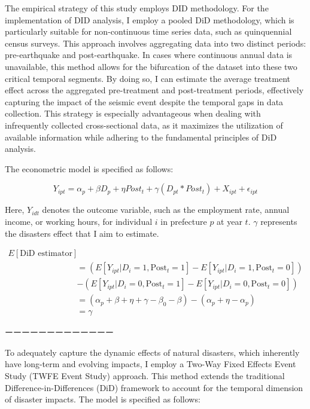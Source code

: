 \documentclass[12pt,halfline,a4paper]{ouparticle}
\begin{document}
The empirical strategy of this study employs DID methodology. For the implementation of DID analysis, I employ a pooled DiD methodology, which is particularly suitable for non-continuous time series data, such as quinquennial census surveys. This approach involves aggregating data into two distinct periods: pre-earthquake and post-earthquake. In cases where continuous annual data is unavailable, this method allows for the bifurcation of the dataset into these two critical temporal segments. By doing so, I can estimate the average treatment effect across the aggregated pre-treatment and post-treatment periods, effectively capturing the impact of the seismic event despite the temporal gaps in data collection. This strategy is especially advantageous when dealing with infrequently collected cross-sectional data, as it maximizes the utilization of available information while adhering to the fundamental principles of DiD analysis.

The econometric model is specified as follows:

\begin{equation}
Y_{ipt} = \alpha_{p} + \beta D_{p} + \eta Post_{t} + \gamma (D_{pt} * Post_{t}) + X_{ipt} + \epsilon_{ipt}
\end{equation}

Here, \( Y_{idt} \) denotes the outcome variable, such as the employment rate, annual income, or working hours, for individual \( i \) in prefecture \( p \) at year \( t \). \( \gamma \) represents the disasters effect that I aim to estimate. 


\begin{equation}
\begin{aligned}
E[\text{DiD estimator}] \\
&= (E[Y_{ipt}|D_i = 1, \text{Post}_t = 1] - E[Y_{ipt}|D_i = 1, \text{Post}_t = 0]) \\
&- (E[Y_{ipt}|D_i = 0, \text{Post}_t = 1] - E[Y_{ipt}|D_i = 0, \text{Post}_t = 0]) \\
&= (\alpha_{p} + \beta + \eta + \gamma - \beta_0 - \beta) - (\alpha_{p} + \eta - \alpha_{p}) \\
&= \gamma
\end{aligned}
\end{equation}





ーーーーーーーーーーーーー

To adequately capture the dynamic effects of natural disasters, which inherently have long-term and evolving impacts, I employ a Two-Way Fixed Effects Event Study (TWFE Event Study) approach. This method extends the traditional Difference-in-Differences (DiD) framework to account for the temporal dimension of disaster impacts. The model is specified as follows:
\end{document}
